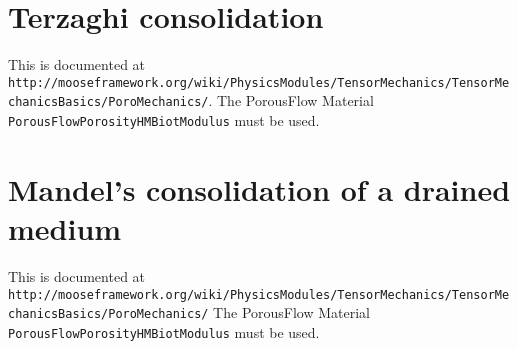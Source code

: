 \documentclass[]{scrreprt}
\begin{document}
\chapter{Terzaghi consolidation}

This is documented at {\tt
  http://mooseframework.org/wiki/PhysicsModules/TensorMechanics/TensorMechanicsBasics/PoroMechanics/}.
The PorousFlow Material {\tt PorousFlowPorosityHMBiotModulus} must be used.

\chapter{Mandel's consolidation of a drained medium}

This is documented at {\tt http://mooseframework.org/wiki/PhysicsModules/TensorMechanics/TensorMechanicsBasics/PoroMechanics/}
The PorousFlow Material {\tt PorousFlowPorosityHMBiotModulus} must be used.
\end{document}
